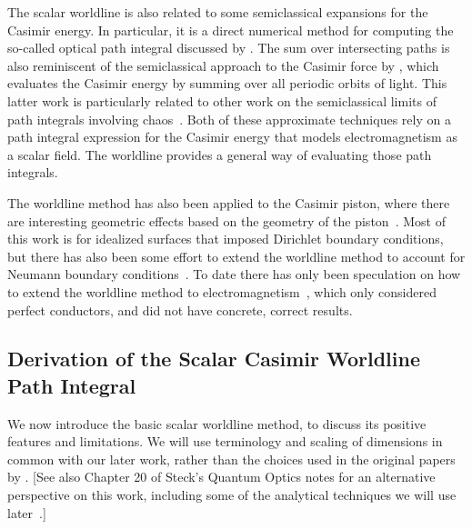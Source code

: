The scalar worldline is also related to some semiclassical expansions for the Casimir energy.  
In particular, it is a direct numerical method for computing the so-called optical path integral
discussed by \citet{Scardicchio2005, Scardicchio2006}.  The sum over intersecting paths is also reminiscent 
of the semiclassical approach to the Casimir force by \citet{Schaden1998}, which evaluates 
the Casimir energy by summing over all periodic orbits of light.  This latter work is particularly 
related to other work on the semiclassical limits of path integrals involving chaos~\citep{Gutzwiller1990}.
Both of these approximate techniques rely on a path integral expression for the Casimir energy that models electromagnetism as a
scalar field. The worldline provides a general way of evaluating those path integrals.   

The worldline method has also been applied to the Casimir piston, where there are interesting geometric effects
based on the geometry of the piston~\citep{Schaden2009,Schaden2009a}.
Most of this work is for idealized surfaces that imposed Dirichlet boundary conditions, but 
there has also been some effort to extend the worldline method to account for Neumann boundary
conditions~\citep{Fosco2010}.  To date there has only been speculation on how to extend the 
worldline method to electromagnetism~\citep{Aehlig2011}, which only considered perfect conductors,
and did not have concrete, correct results.    



\subsection{Derivation of the Scalar Casimir Worldline Path Integral}
\label{sec:dirichlet_worldline_derivation}
We now introduce the basic scalar worldline method, to discuss its positive features and limitations. 
We will use terminology and scaling of dimensions in common with our later work, rather than the 
choices used in the original papers by \citet{Gies2003}.
[See also Chapter 20 of Steck's Quantum Optics notes for an alternative perspective on this work, including
some of the analytical techniques we will use later~\citep{SteckNotes}.]


